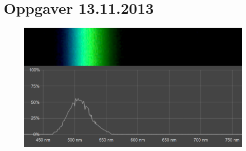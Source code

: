 
\section{Oppgaver 13.11.2013}
\begin{figure}[H]
\centering
\includegraphics[width=\textwidth]{img/photosynthesis/spectrometer.png}
\end{figure}
